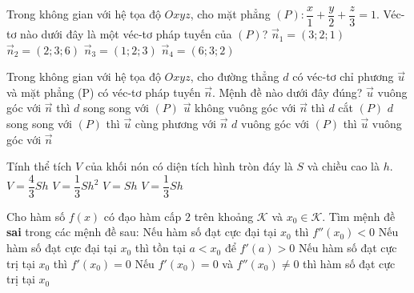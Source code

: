 \begin{ex}%
	Trong không gian với hệ tọa độ $Oxyz$, cho mặt phẳng $(P): \dfrac{x}{1}+\dfrac{y}{2}+\dfrac{z}{3} = 1$. Véc-tơ nào dưới đây là một véc-tơ pháp tuyến của $(P)$?
	\choice
	{$\overrightarrow{n}_1 = (3;2;1)$}
	{$\overrightarrow{n}_2 = (2;3;6)$}
	{$\overrightarrow{n}_3 = (1;2;3)$}
	{\True $\overrightarrow{n}_4 = (6;3;2)$}
\end{ex}

\begin{ex}%
	Trong không gian với hệ tọa độ $Oxyz$, cho đường thẳng $d$ có véc-tơ chỉ phương $\overrightarrow{u}$ và mặt phẳng (P) có véc-tơ pháp tuyến $\overrightarrow{n}$. Mệnh đề nào dưới đây đúng?
	\choice
	{$\overrightarrow{u}$ vuông góc với $\overrightarrow{n}$ thì $d$ song song với $(P)$}
	{\True $\overrightarrow{u}$ không vuông góc với $\overrightarrow{n}$ thì $d$ cắt $(P)$}
	{$d$ song song với $(P)$ thì $\overrightarrow{u}$ cùng phương với $\overrightarrow{n}$}
	{$d$ vuông góc với $(P)$ thì $\overrightarrow{u}$ vuông góc với $\overrightarrow{n}$}
\end{ex}

\begin{ex}%
	Tính thể tích $V$ của khối nón có diện tích hình tròn đáy là $S$ và chiều cao là $h$.
	\choice
	{$V = \dfrac{4}{3} Sh$}
	{$V = \dfrac{1}{3} Sh^2$}
	{$V = Sh$}
	{\True $V = \dfrac{1}{3} Sh$}
\end{ex}

\begin{ex}%
	Cho hàm số $f(x)$ có đạo hàm cấp $2$ trên khoảng $\mathscr{K}$ và $x_0 \in \mathscr{K}$. Tìm mệnh đề \textbf{sai} trong các mệnh đề sau:
	\choice
	{\True Nếu hàm số đạt cực đại tại $x_0$ thì $f''(x_0) < 0$}
	{Nếu hàm số đạt cực đại tại $x_0$ thì tồn tại $a<x_0$ để $f'(a)>0$}
	{Nếu hàm số đạt cực trị tại $x_0$ thì $f'(x_0) = 0$}
	{Nếu $f'(x_0) = 0$ và $f''(x_0) \neq 0$ thì hàm số đạt cực trị tại $x_0$}
\end{ex}

